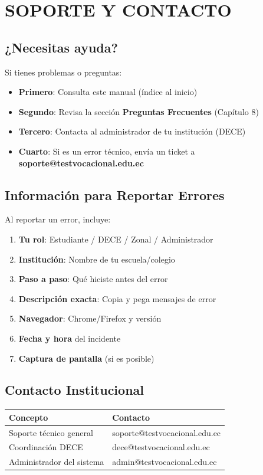 \documentclass[12pt, a4paper]{report}
\begin{document}
\chapter{SOPORTE Y CONTACTO}

\section{¿Necesitas ayuda?}
Si tienes problemas o preguntas:

\begin{itemize}
    \item \textbf{Primero}: Consulta este manual (índice al inicio)
    \item \textbf{Segundo}: Revisa la sección \textbf{Preguntas Frecuentes} (Capítulo 8)
    \item \textbf{Tercero}: Contacta al administrador de tu institución (DECE)
    \item \textbf{Cuarto}: Si es un error técnico, envía un ticket a \textbf{soporte@testvocacional.edu.ec}
\end{itemize}

\section{Información para Reportar Errores}
Al reportar un error, incluye:
\begin{enumerate}
    \item \textbf{Tu rol}: Estudiante / DECE / Zonal / Administrador
    \item \textbf{Institución}: Nombre de tu escuela/colegio
    \item \textbf{Paso a paso}: Qué hiciste antes del error
    \item \textbf{Descripción exacta}: Copia y pega mensajes de error
    \item \textbf{Navegador}: Chrome/Firefox y versión
    \item \textbf{Fecha y hora} del incidente
    \item \textbf{Captura de pantalla} (si es posible)
\end{enumerate}

\section{Contacto Institucional}
\begin{table}[htbp]
\centering
\begin{tabularx}{\textwidth}{|l|X|}
\hline
\textbf{Concepto} & \textbf{Contacto} \\
\hline
Soporte técnico general & soporte@testvocacional.edu.ec \\
Coordinación DECE & dece@testvocacional.edu.ec \\
Administrador del sistema & admin@testvocacional.edu.ec \\
\hline
\end{tabularx}
\end{table}
\end{document}
